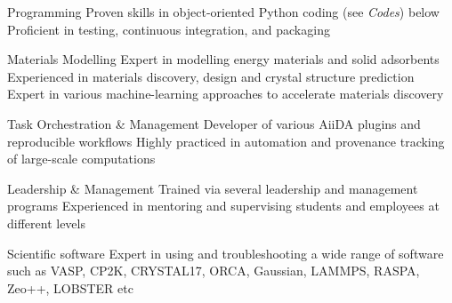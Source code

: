 

\begin{cvskillsnoncentered}

  \cvskill
  {Programming} %
  {Proven skills in object-oriented Python coding (see \textit{Codes}) below}
  \cvskill
  {}
  {Proficient in testing, continuous integration, and packaging}

  \cvskill
  {Materials Modelling} %
  {Expert in modelling energy materials and solid adsorbents}
  \cvskill
  {}
  {Experienced in materials discovery, design and crystal structure prediction}
  \cvskill
  {}
  {Expert in various machine-learning approaches to accelerate materials discovery}

  \cvskill
  {Task Orchestration \& Management}
  {Developer of various AiiDA plugins and reproducible workflows}
  \cvskill
  {}
  {Highly practiced in automation and provenance tracking of large-scale computations}

  \cvskill
  {Leadership \& Management} %
  {Trained via several leadership and management programs}
  \cvskill
  {}
  {Experienced in mentoring and supervising students and employees at different levels}

  \cvskill
  {Scientific software} %
  {Expert in using and troubleshooting a wide range of software such as}
  \cvskill
  {}
  {VASP, CP2K, CRYSTAL17, ORCA, Gaussian, LAMMPS, RASPA, Zeo++, LOBSTER etc}
\end{cvskillsnoncentered}
